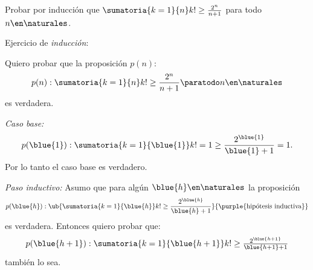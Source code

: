 \begin{enunciado}{\ejExtra}

  Probar por inducción que $\sumatoria{k=1}{n} k! \geq \frac{2^n}{n+1}$ para todo $n \en \naturales$.
\end{enunciado}

Ejercicio de \textit{inducción}:

Quiero probar que la proposición $p(n)$:
$$
  p(n) : \sumatoria{k=1}{n} k! \geq \frac{2^n}{n+1} \paratodo n \en \naturales
$$
es verdadera.

\textit{Caso base:}
$$
  p(\blue{1}) : \sumatoria{k=1}{\blue{1}} k!  = 1 \geq \frac{2^{\blue{1}}}{\blue{1} + 1} = 1.
$$
Por lo tanto el caso base es verdadero.

\bigskip

\textit{Paso inductivo:}
Asumo que para algún $\blue{h} \en \naturales$ la proposición
$$
  p(\blue{h}) :
  \ub{
    \sumatoria{k = 1}{\blue{h}} k!  \geq \frac{2^{\blue{h}}}{\blue{h} + 1}
  }{
    \text{\purple{hipótesis inductiva}}
  }
$$
es verdadera. Entonces quiero probar que:
$$
  \textstyle
  p(\blue{h + 1}) : \sumatoria{k=1}{\blue{h + 1}} k!  \geq \frac{2^{\blue{h + 1}}}{\blue{ h + 1 } + 1}
$$
también lo sea.

